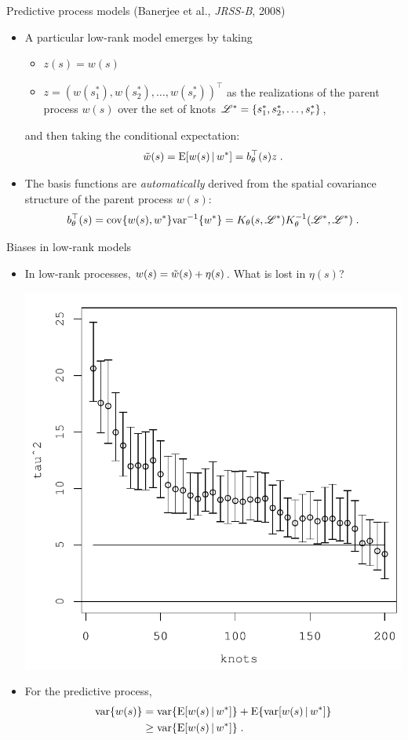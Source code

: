 \begin{frame}{Predictive process models (Banerjee et al., \emph{JRSS-B}, 2008)}

\begin{itemize}\setlength{\itemsep}{0.4cm}
\item A particular low-rank model emerges by taking 
\begin{itemize}\setlength{\itemsep}{0.25cm}
 \item $z(s) = w(s)$
 \item $z = (w(s_1^*), w(s_2^*),\ldots, w(s_r^*))^{\top}$ as the realizations of the parent process $w(s)$ over the set of knots ${\cal L}^* = \{s_1^*, s_2^*, \ldots, s_r^*\}$,
\end{itemize}
and then taking the conditional expectation:
\[
 \tilde{w}(s)= \mbox{E}[w(s)\,|\, w^{\ast}] = b_{\theta}^{\top}(s)z\; .
\]

\item The basis functions are \emph{automatically} derived from the spatial covariance structure of the parent process $w(s)$:
\[
b_{\theta}^{\top}(s) = \mbox{cov}\{w(s), w^{\ast}\}\mbox{var}^{-1}\{w^{\ast}\} = K_{\theta}(s,{\cal L}^*)K_{\theta}^{-1}({\cal L}^*, {\cal L}^*) \;.
\]

\end{itemize}

\end{frame}


\begin{frame}{Biases in low-rank models}

\begin{itemize}\setlength{\itemsep}{0.cm}
\item In low-rank processes, $w(s) = \tilde{w}(s) + \eta(s)$. What is lost in $\eta(s)$?

\begin{center}
\includegraphics[width=.5\textwidth, height=.5\textheight]{../figures/n200_knots_by_5_tauSq.pdf}
\end{center}

\item For the predictive process,
\begin{align*}\label{eq: predictive_process_bias_inequality}
 \mbox{var}\{w(s)\} &= \mbox{var}\{\mbox{E}[w(s)\,|\, w^*]\} + \mbox{E}\{\mbox{var}[w(s)\,|\, w^*]\} \\
& \geq \mbox{var}\{\mbox{E}[w(s)\,|\, w^*]\}\; .
\end{align*}

\end{itemize}

\end{frame}

